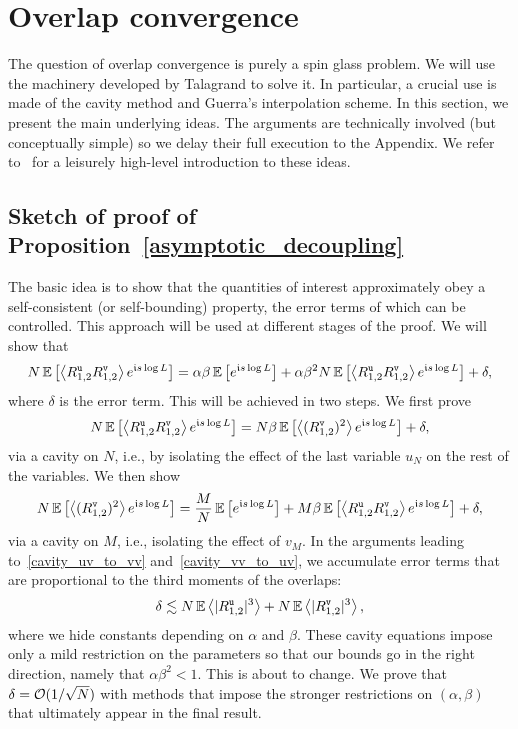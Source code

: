 \documentclass[final,12pt]{colt2018} %
\newcommand{\utt}{\textup{\texttt{u}}}
\newcommand{\vtt}{\textup{\texttt{v}}}
\begin{document}
\section{Overlap convergence}
The question of overlap convergence is purely a spin glass problem. We will use the machinery developed by Talagrand to solve it. In particular, a crucial use is made of the cavity method and Guerra's interpolation scheme. In this section, we present the main underlying ideas. The arguments are technically involved (but conceptually simple) so we delay their full execution to the Appendix. We refer to~\cite{talagrand2007obnoxious} for a leisurely high-level introduction to these ideas. 

\subsection{Sketch of proof of Proposition~\ref{asymptotic_decoupling}}
The basic idea is to show that the quantities of interest approximately obey a self-consistent (or self-bounding) property, the error terms of which can be controlled. This approach will be used at different stages of the proof.  
We will show that 
\[N\E\left[\left\langle R^{\utt}_{1,2}R^{\vtt}_{1,2}\right\rangle e^{\imnb s \log L}\right] = \alpha\beta \E\left[e^{\imnb s \log L}\right]+\alpha\beta^2 N \E\left[\left\langle R^{\utt}_{1,2}R^{\vtt}_{1,2}\right\rangle e^{\imnb s \log L}\right] + \delta, \]
where $\delta$ is the error term. This will be achieved in two steps. We first prove
\begin{equation}\label{cavity_uv_to_vv}
N\E\left[\left\langle R^{\utt}_{1,2} R^{\vtt}_{1,2}\right\rangle e^{\imnb s \log L}\right] = N\beta \E\left[\left\langle (R^{\vtt}_{1,2})^2\right\rangle e^{\imnb s \log L}\right] + \delta,
\end{equation}
via a cavity on $N$, i.e., by isolating the effect of the last variable $u_N$ on the rest of the variables. We then show 
\begin{equation}\label{cavity_vv_to_uv}
N\E\left[\left\langle (R^{\vtt}_{1,2})^2\right\rangle e^{\imnb s \log L}\right]  = \frac{M}{N}  \E\left[e^{\imnb s \log L}\right]  + M \beta \E\left[\left\langle R^{\utt}_{1,2} R^{\vtt}_{1,2}\right\rangle e^{\imnb s \log L}\right] +\delta,
\end{equation}
via a cavity on $M$, i.e., isolating the effect of $v_M$. In the arguments leading to~\eqref{cavity_uv_to_vv} and~\eqref{cavity_vv_to_uv}, we accumulate error terms that are proportional to the third moments of the overlaps:
\begin{equation}\label{error_term_delta}
\delta \lesssim N\E\left\langle |R^{\utt}_{1,2}|^{3}\right\rangle + N\E\left\langle |R^{\vtt}_{1,2}|^{3}\right\rangle,
\end{equation}
where we hide constants depending on $\alpha$ and $\beta$.
These cavity equations impose only a mild restriction on the parameters so that our bounds go in the right direction, namely that $\alpha \beta^2 <1$. This is about to change. We prove that $\delta = \mathcal{O}(1/\sqrt{N})$ with methods that impose the stronger restrictions on $(\alpha,\beta)$ that ultimately appear in the final result. 
\end{document}
